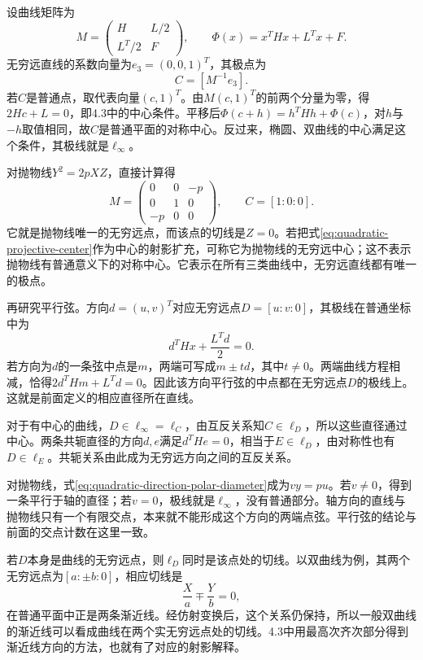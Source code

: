 设曲线矩阵为
\begin{equation*}
 M=\begin{pmatrix}H&L/2\\L^T/2&F\end{pmatrix},
 \qquad \Phi(x)=x^THx+L^Tx+F.
\end{equation*}
无穷远直线的系数向量为\(e_3=(0,0,1)^T\)，其极点为
\begin{equation}\label{eq:quadratic-projective-center}
 C=[M^{-1}e_3].
\end{equation}
若\(C\)是普通点，取代表向量\((c,1)^T\)。由\(M(c,1)^T\)的前两个分量为零，得\(2Hc+L=0\)，即4.3中的中心条件。平移后\(\Phi(c+h)=h^THh+\Phi(c)\)，对\(h\)与\(-h\)取值相同，故\(C\)是普通平面的对称中心。反过来，椭圆、双曲线的中心满足这个条件，其极线就是\(\ell_\infty\)。

对抛物线\(Y^2=2pXZ\)，直接计算得
\begin{equation*}
 M=\begin{pmatrix}0&0&-p\\0&1&0\\-p&0&0\end{pmatrix},\qquad
 C=[1:0:0].
\end{equation*}
它就是抛物线唯一的无穷远点，而该点的切线是\(Z=0\)。若把式\eqref{eq:quadratic-projective-center}作为中心的射影扩充，可称它为抛物线的{\heiti{}无穷远中心}；这不表示抛物线有普通意义下的对称中心。它表示在所有三类曲线中，无穷远直线都有唯一的极点。

再研究平行弦。方向\(d=(u,v)^T\)对应无穷远点\(D=[u:v:0]\)，其极线在普通坐标中为
\begin{equation}\label{eq:quadratic-direction-polar-diameter}
 d^THx+\frac{L^Td}{2}=0.
\end{equation}
若方向为\(d\)的一条弦中点是\(m\)，两端可写成\(m\pm td\)，其中\(t\ne0\)。两端曲线方程相减，恰得\(2d^THm+L^Td=0\)。因此该方向平行弦的中点都在无穷远点\(D\)的极线上。这就是前面定义的相应直径所在直线。

对于有中心的曲线，\(D\in\ell_\infty=\ell_C\)，由互反关系知\(C\in\ell_D\)，所以这些直径通过中心。两条共轭直径的方向\(d,e\)满足\(d^THe=0\)，相当于\(E\in\ell_D\)，由对称性也有\(D\in\ell_E\)。共轭关系由此成为无穷远方向之间的互反关系。

对抛物线，式\eqref{eq:quadratic-direction-polar-diameter}成为\(vy=pu\)。若\(v\ne0\)，得到一条平行于轴的直径；若\(v=0\)，极线就是\(\ell_\infty\)，没有普通部分。轴方向的直线与抛物线只有一个有限交点，本来就不能形成这个方向的两端点弦。平行弦的结论与前面的交点计数在这里一致。

\begin{samepage}
若\(D\)本身是曲线的无穷远点，则\(\ell_D\)同时是该点处的切线。以双曲线为例，其两个无穷远点为\([a:\pm b:0]\)，相应切线是
\begin{equation*}
 \frac Xa\mp\frac Yb=0,
\end{equation*}
在普通平面中正是两条渐近线。经仿射变换后，这个关系仍保持，所以一般双曲线的渐近线可以看成曲线在两个实无穷远点处的切线。4.3中用最高次齐次部分得到渐近线方向的方法，也就有了对应的射影解释。
\par\end{samepage}

